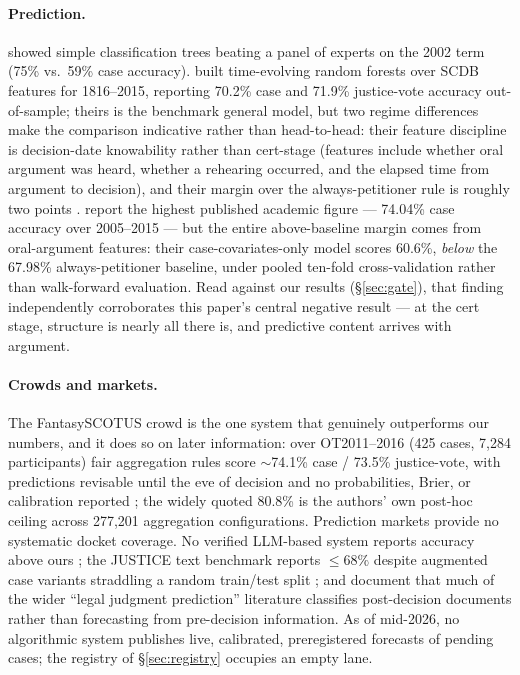 \documentclass[11pt]{article}
\begin{document}
\paragraph{Prediction.} \citet{ruger2004} showed simple classification trees
beating a panel of experts on the 2002 term (75\% vs.\ 59\% case accuracy).
\citet{katz2017} built time-evolving random forests over SCDB features for
1816--2015, reporting 70.2\% case and 71.9\% justice-vote accuracy out-of-sample;
theirs is the benchmark general model, but two regime differences make the
comparison indicative rather than head-to-head: their feature discipline is
decision-date knowability rather than cert-stage (features include whether oral
argument was heard, whether a rehearing occurred, and the elapsed time from
argument to decision), and their margin over the always-petitioner rule is
roughly two points \citep[whose survey characterizes it as ``a small improvement
over the 68\% baseline'']{medvedeva2023}. \citet{kaufman2019} report the highest
published academic figure --- 74.04\% case accuracy over 2005--2015 --- but the
entire above-baseline margin comes from oral-argument features: their
case-covariates-only model scores 60.6\%, \emph{below} the 67.98\%
always-petitioner baseline, under pooled ten-fold cross-validation rather than
walk-forward evaluation. Read against our results (\S\ref{sec:gate}), that
finding independently corroborates this paper's central negative result --- at
the cert stage, structure is nearly all there is, and predictive content arrives
with argument.

\paragraph{Crowds and markets.} The FantasySCOTUS crowd is the one system that
genuinely outperforms our numbers, and it does so on later information: over
OT2011--2016 (425 cases, 7{,}284 participants) fair aggregation rules score
$\sim$74.1\% case / 73.5\% justice-vote, with predictions revisable until the eve
of decision and no probabilities, Brier, or calibration reported
\citep{katz2017crowd}; the widely quoted 80.8\% is the authors' own post-hoc
ceiling across 277{,}201 aggregation configurations. Prediction markets provide
no systematic docket coverage. No verified LLM-based system reports accuracy
above ours \citep[60\% case]{hamilton2023}; the JUSTICE text benchmark reports
$\le 68\%$ despite augmented case variants straddling a random train/test split
\citep{alali2021}; and \citet{medvedeva2023} document that much of the wider
``legal judgment prediction'' literature classifies post-decision documents
rather than forecasting from pre-decision information. As of mid-2026, no
algorithmic system publishes live, calibrated, preregistered forecasts of
pending cases; the registry of \S\ref{sec:registry} occupies an empty lane.
\end{document}
